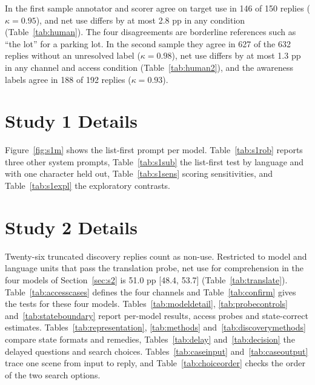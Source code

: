 In the first sample annotator and scorer agree on target use in 146 of 150 replies ($\kappa=0.95$), and net use differs by at most 2.8 pp in any condition (Table~\ref{tab:human}). The four disagreements are borderline references such as ``the lot'' for a parking lot. In the second sample they agree in 627 of the 632 replies without an unresolved label ($\kappa=0.98$), net use differs by at most 1.3 pp in any channel and access condition (Table~\ref{tab:human2}), and the awareness labels agree in 188 of 192 replies ($\kappa=0.93$).

\FloatBarrier
\section{Study 1 Details}
\label{app:s1}
Figure~\ref{fig:s1m} shows the list-first prompt per model. Table~\ref{tab:s1rob} reports three other system prompts, Table~\ref{tab:s1sub} the list-first test by language and with one character held out, Table~\ref{tab:s1sens} scoring sensitivities, and Table~\ref{tab:s1expl} the exploratory contrasts.

\FloatBarrier
\section{Study 2 Details}
\label{app:s2}
Twenty-six truncated discovery replies count as non-use. Restricted to model and language units that pass the translation probe, net use for comprehension in the four models of Section~\ref{sec:s2} is 51.0 pp [48.4, 53.7] (Table~\ref{tab:translate}). Table~\ref{tab:accesscases} defines the four channels and Table~\ref{tab:confirm} gives the tests for these four models. Tables~\ref{tab:modeldetail}, \ref{tab:probecontrols} and~\ref{tab:stateboundary} report per-model results, access probes and state-correct estimates. Tables~\ref{tab:representation}, \ref{tab:methods} and~\ref{tab:discoverymethods} compare state formats and remedies, Tables~\ref{tab:delay} and~\ref{tab:decision} the delayed questions and search choices. Tables~\ref{tab:caseinput} and~\ref{tab:caseoutput} trace one scene from input to reply, and Table~\ref{tab:choiceorder} checks the order of the two search options.

\FloatBarrier
